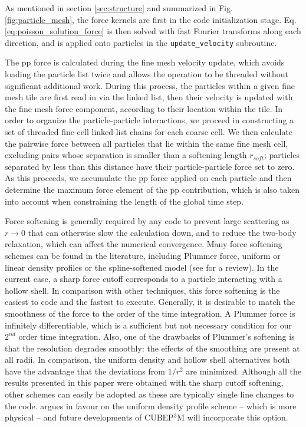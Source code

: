 \documentclass[useAMS,usenatbib]{mn2e}
\begin{document}
As mentioned in section \ref{sec:structure} and summarized in Fig. \ref{fig:particle_mesh},
the force kernels are first  in the code initialization stage.
Eq. \ref{eq:poisson_solution_force} is then solved with fast Fourier transforms along each direction, 
 and is applied onto particles in the {\tt update\_velocity} subroutine.

The pp force is calculated during the fine mesh velocity update, which avoids loading the particle list twice and allows the operation to be threaded without significant additional work. During this process, the particles within a given fine mesh tile are first read in via the linked list, 
then their velocity is updated with the fine mesh force component, according to their location within the tile. 
In order to organize the particle-particle interactions, we proceed in constructing a set of threaded fine-cell linked list chains for each coarse cell. 
We then calculate the pairwise force between all particles that lie within the same fine mesh cell, excluding pairs whose separation is smaller than a softening length $r_{soft}$; particles separated by less than this distance have their 
particle-particle force set to zero.  As this proceeds, we accumulate the  pp force applied on each particle and then determine the maximum force element of the pp contribution, which is also taken into account when constraining the length of the global time step. 

Force softening is generally required by any code to prevent
large scattering as $r \rightarrow 0$ that can otherwise slow the calculation down, 
and to reduce the two-body relaxation, which can affect the numerical convergence. 
Many force softening schemes can be found in the literature, including Plummer force, uniform or linear density profiles or the spline-softened model 
(see \citet{1993ApJ...409...60D} for a review). In the current case, a sharp force cutoff corresponds to a particle interacting with a hollow shell.
In comparison with other techniques, this  force softening is the easiest to code and the fastest to execute. 
Generally, it is desirable to match the smoothness of the force to the order of the time integration. 
A Plummer force is infinitely differentiable, which is a sufficient but not necessary condition for our $2^{nd}$ order time integration.  
Also, one of the drawbacks of Plummer's softening is that the resolution degrades smoothly: the effects of the smoothing are present at all radii. 
In comparison, the uniform density and hollow shell alternatives both have the advantage that the deviations from $1/r^2$ are minimized. 
Although all the results presented in this paper were obtained with the sharp cutoff softening, other schemes can easily be adopted as these 
are typically single line changes to the code. \citet{1993ApJ...409...60D} argues in favour on the uniform density profile scheme -- which is more physical --
and future developments of {\small CUBEP$^3$M} will incorporate this option.
\end{document}
